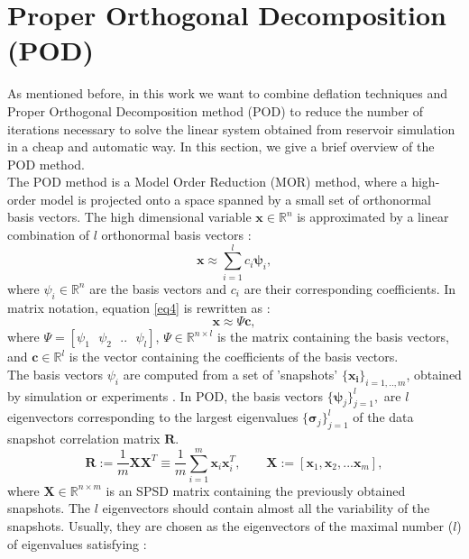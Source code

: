 \documentclass[12pt]{article}
\begin{document}
\section{Proper Orthogonal Decomposition (POD)}\label{POD}

\hspace{0.5cm}
As mentioned before, in this work we want to combine deflation techniques and Proper Orthogonal Decomposition method (POD) to reduce the number of iterations necessary to solve the linear system obtained from reservoir simulation in a cheap and automatic way. In this section, we give a brief overview of the POD method.\\
The POD method is a Model Order Reduction (MOR) method, where a high-order model is projected onto a space
spanned by a small set of orthonormal basis vectors.
The high dimensional variable $\mathbf{x} \in \mathbb{R}^n$
is approximated by a linear combination of $l$ orthonormal basis vectors \cite{Astrid11}:
\begin{equation}\label{eq4}
  \mathbf{x}\approx \sum_{i=1}^lc_i \mathbf{\psi}_i,
\end{equation}
where $\psi_i \in \mathbb{R}^n$ are the basis vectors and $c_i$ are their corresponding coefficients.
In matrix notation, equation \eqref{eq4} is rewritten as :
$$\mathbf{x}\approx \Psi\mathbf{c},$$
where $\Psi=[\psi_1 \text{ }\psi_2 \text{ }.. \text{ }\psi_l]$, $\Psi \in \mathbb{R}^{n\times l}$ 
is the matrix containing the basis vectors, and $\mathbf{c} \in \mathbb{R}^l$ is the vector 
containing the coefficients of the basis vectors. \\
The basis vectors $\psi_i$ are computed from a set of 'snapshots' $\{ \mathbf{x_i}\} _{i=1,..,m}$, 
obtained by simulation or experiments \cite{Mark06}. 
In POD, the basis vectors $\{ \mathbf{\psi} _j \} ^l _{j=1},$ are $l$ eigenvectors corresponding to 
the largest eigenvalues $\{ \mathbf{\sigma} _j \} ^l _{j=1}$ of the data snapshot correlation matrix $\mathbf{R}$.
\begin{equation}\label{eq:POD}
\mathbf{R}:= \frac{1}{m}\mathbf{X}\mathbf{X}^T \equiv \frac{1}{m} \sum_{i=1}^m \mathbf{x}_i \mathbf{x}_i^T,
\qquad \mathbf{X}:=[\mathbf{x}_1,\mathbf{x}_2,...\mathbf{x}_m],
\end{equation}
where $\mathbf{X}\in \mathbb{R}^{n\times m}$ is an SPSD matrix containing the previously obtained snapshots.
The $l$ eigenvectors should contain almost all the variability of the snapshots. 
Usually, they are chosen as the eigenvectors of the maximal number ($l$) of eigenvalues satisfying \cite{Mark06}:
\end{document}
